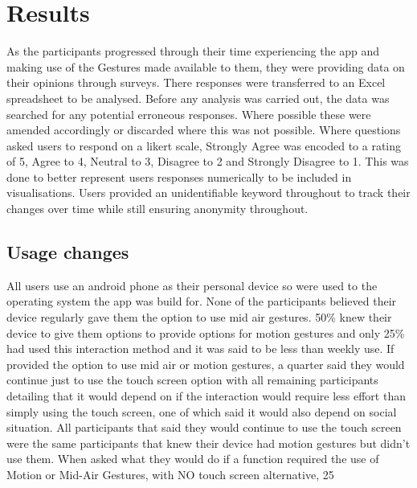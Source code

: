 \documentclass{l4proj}
\begin{document}

\chapter{Results} 
As the participants progressed through their time experiencing the app and making use of the Gestures made available to them, they were providing data on their opinions through surveys. There responses were transferred to an Excel spreadsheet to be analysed. Before any analysis was carried out, the data was searched for any potential erroneous responses. Where possible these were amended accordingly or discarded where this was not possible. Where questions asked users to respond on a likert scale, Strongly Agree was encoded to a rating of 5, Agree to 4, Neutral to 3, Disagree to 2 and Strongly Disagree to 1. This was done to better represent users responses numerically to be included in visualisations. Users provided an unidentifiable keyword throughout to track their changes over time while still ensuring anonymity throughout. 

\section{Usage changes}
All users use an android phone as their personal device so were used to the operating system the app was build for. None of the participants believed their device regularly gave them the option to use mid air gestures. 50\% knew their device to give them options to provide options for motion gestures and only 25\% had used this interaction method and it was said to be less than weekly use. If provided the option to use mid air or motion gestures, a quarter said they would continue just to use the touch screen option with all remaining participants detailing that it would depend on if the interaction would require less effort than simply using the touch screen, one of which said it would also depend on social situation. All participants that said they would continue to use the touch screen were the same participants that knew their device had motion gestures but didn't use them. When asked what they would do if a function required the use of Motion or Mid-Air Gestures, with NO touch screen alternative, 25%
\end{document}

